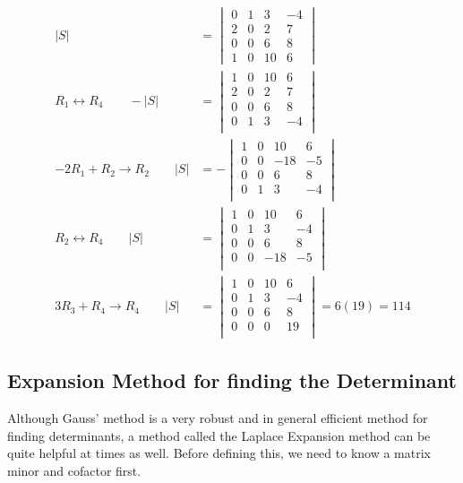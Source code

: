 \begin{example}
\begin{align*}
|S| & = \begin{vmatrix}
0 & 1 & 3  & -4 \\
2 & 0 & 2 & 7 \\
0 & 0 & 6 & 8 \\
1 & 0 & 10 & 6 
\end{vmatrix} \\
R_1 \leftrightarrow R_4 \qquad  -|S| & = 
\begin{vmatrix}
1 & 0 & 10 & 6 \\
2 & 0 & 2 & 7 \\
0 & 0 & 6 & 8 \\
0 & 1 & 3  & -4 \\
\end{vmatrix} \\
-2R_1 + R_2 \rightarrow R_2 \qquad |S| &= 
- \begin{vmatrix}
1 & 0 & 10 & 6 \\
0 & 0 & -18 & -5 \\
0 & 0 & 6 & 8 \\
0 & 1 & 3  & -4 \\
\end{vmatrix} \\
R_2 \leftrightarrow R_4 \qquad |S| &= 
\begin{vmatrix}
1 & 0 & 10 & 6 \\
0 & 1 & 3  & -4 \\
0 & 0 & 6 & 8 \\
0 & 0 & -18 & -5 \\
\end{vmatrix} \\
3 R_3 + R_4 \rightarrow R_4 \qquad |S| & =
\begin{vmatrix}
1 & 0 & 10 & 6 \\
0 & 1 & 3  & -4 \\
0 & 0 & 6 & 8 \\
0 & 0 & 0 & 19 \\
\end{vmatrix} = 6 (19) = 114 
\end{align*}

\end{example}

\subsection{Expansion Method for finding the Determinant} 

Although Gauss' method is a very robust and in general efficient method for finding determinants, a method called the Laplace Expansion method can be quite helpful at times as well.  Before defining this, we need to know a matrix minor and cofactor first.  

